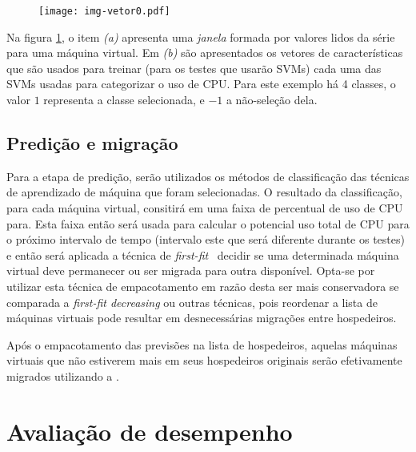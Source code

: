 \begin{figure}[htp]
\centering
\texttt{[image: img-vetor0.pdf]}
\label{fig:vetor0}
\end{figure}

Na figura \ref{fig:vetor0}, o item \emph{(a)} apresenta uma \emph{janela}
formada por valores lidos da série para uma máquina virtual. Em \emph{(b)}
são apresentados os vetores de características que são usados para treinar
(para os testes que usarão SVMs) cada uma das SVMs usadas para categorizar
o uso de CPU. Para este exemplo há 4 classes, o valor $1$ representa a
classe selecionada, e $-1$ a não-seleção dela.

\subsection{Predição e migração}

Para a etapa de predição, serão utilizados os métodos de classificação das
técnicas de aprendizado de máquina que foram selecionadas. O resultado da
classificação, para cada máquina virtual, consitirá em uma faixa de
percentual de uso de CPU para. Esta faixa então será usada para calcular o
potencial uso total de CPU para o próximo intervalo de tempo (intervalo
este que será diferente durante os testes) e então será aplicada a técnica
de \emph{first-fit}~\cite{yao1980new} decidir se uma determinada máquina
virtual deve permanecer ou ser migrada para outra disponível. Opta-se por
utilizar esta técnica de empacotamento em razão desta ser mais conservadora
se comparada a \emph{first-fit decreasing} ou outras técnicas, pois
reordenar a lista de máquinas virtuais pode resultar em desnecessárias
migrações entre hospedeiros.

Após o empacotamento das previsões na lista de hospedeiros, aquelas
máquinas virtuais que não estiverem mais em seus hospedeiros originais
serão efetivamente migrados utilizando a \libvirt{}.

\section{Avaliação de desempenho}\label{sec:desemp}


